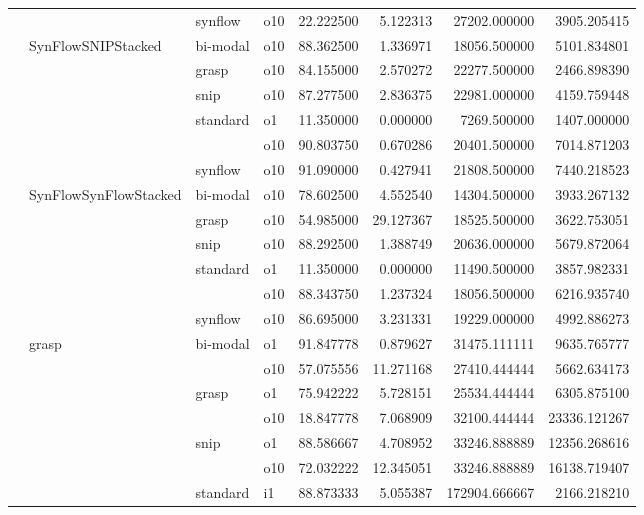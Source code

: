 \begin{longtable}{llllrrrr}
      &     & synflow & o10 &  22.222500 &   5.122313 &     27202.000000 &   3905.205415 \\
      & SynFlowSNIPStacked & bi-modal & o10 &  88.362500 &   1.336971 &     18056.500000 &   5101.834801 \\
      &     & grasp & o10 &  84.155000 &   2.570272 &     22277.500000 &   2466.898390 \\
      &     & snip & o10 &  87.277500 &   2.836375 &     22981.000000 &   4159.759448 \\
      &     & standard & o1 &  11.350000 &   0.000000 &      7269.500000 &   1407.000000 \\
      &     &         & o10 &  90.803750 &   0.670286 &     20401.500000 &   7014.871203 \\
      &     & synflow & o10 &  91.090000 &   0.427941 &     21808.500000 &   7440.218523 \\
      & SynFlowSynFlowStacked & bi-modal & o10 &  78.602500 &   4.552540 &     14304.500000 &   3933.267132 \\
      &     & grasp & o10 &  54.985000 &  29.127367 &     18525.500000 &   3622.753051 \\
      &     & snip & o10 &  88.292500 &   1.388749 &     20636.000000 &   5679.872064 \\
      &     & standard & o1 &  11.350000 &   0.000000 &     11490.500000 &   3857.982331 \\
      &     &         & o10 &  88.343750 &   1.237324 &     18056.500000 &   6216.935740 \\
      &     & synflow & o10 &  86.695000 &   3.231331 &     19229.000000 &   4992.886273 \\
      & grasp & bi-modal & o1 &  91.847778 &   0.879627 &     31475.111111 &   9635.765777 \\
      &     &         & o10 &  57.075556 &  11.271168 &     27410.444444 &   5662.634173 \\
      &     & grasp & o1 &  75.942222 &   5.728151 &     25534.444444 &   6305.875100 \\
      &     &         & o10 &  18.847778 &   7.068909 &     32100.444444 &  23336.121267 \\
      &     & snip & o1 &  88.586667 &   4.708952 &     33246.888889 &  12356.268616 \\
      &     &         & o10 &  72.032222 &  12.345051 &     33246.888889 &  16138.719407 \\
      &     & standard & i1 &  88.873333 &   5.055387 &    172904.666667 &   2166.218210 \\

\end{longtable}
